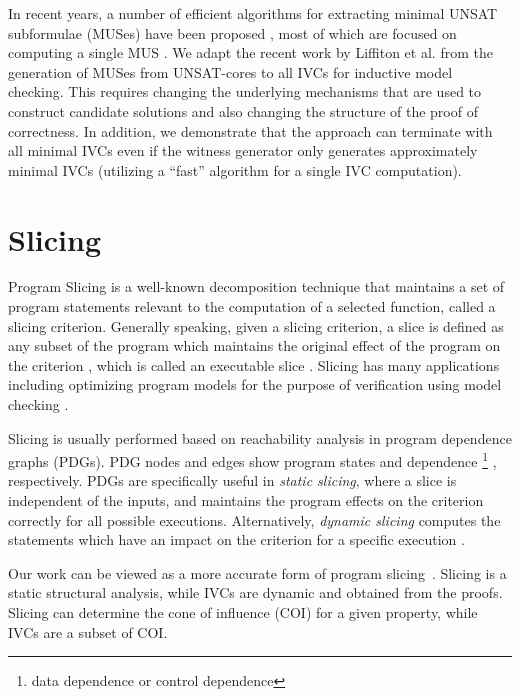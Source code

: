  In  recent  years,  a  number  of  efficient algorithms  for  extracting minimal UNSAT subformulae (MUSes)  have  been proposed \cite{liffiton2005max},
most of which are focused on computing a single MUS  \cite{bacchus2015using, belov2012muser2, belov2013core, belov2012towards, nadel2014accelerated}.  We adapt the recent work by Liffiton et al. \cite{marco2016fast} from the generation of MUSes from UNSAT-cores to all IVCs for inductive model checking.  This requires changing the underlying mechanisms that are used to construct candidate solutions and also changing the structure of the proof of correctness.  In addition, we demonstrate that the approach can terminate with all minimal IVCs even if the witness generator only generates approximately minimal IVCs (utilizing a ``fast''  algorithm for a single IVC computation).

\section{Slicing}

Program  Slicing  is  a  well-known  decomposition  technique  that  maintains a
set of program statements  relevant to  the computation  of a  selected  function, called a slicing criterion. Generally speaking, given a slicing criterion, a slice is defined
 as any subset of the program which maintains the original effect of the program on the criterion \cite{Weiser97}, which is called an executable slice \cite{Androutsopoulos}.
  Slicing has many applications including optimizing program models
   for the purpose of verification using model checking \cite{Androutsopoulos, Jhala:2005, Dwyer:2006}.

Slicing is usually performed based on reachability analysis in program
dependence graphs (PDGs). PDG nodes and edges show program states and dependence \footnote{data dependence or control dependence}
, respectively. PDGs are specifically useful in \emph{static slicing}, where
a slice is independent of the inputs,
 and maintains the program effects on the criterion
correctly for all possible executions. Alternatively,
\emph{dynamic slicing} computes the statements which have an impact on the criterion for a
specific execution \cite{Androutsopoulos}.

Our work can be viewed as a more accurate form of program slicing~\cite{Tip95asurvey}.
Slicing is a static structural analysis, while IVCs are dynamic and obtained from the proofs. Slicing can determine the cone of influence (COI) for a given property, while IVCs are a subset of COI.

